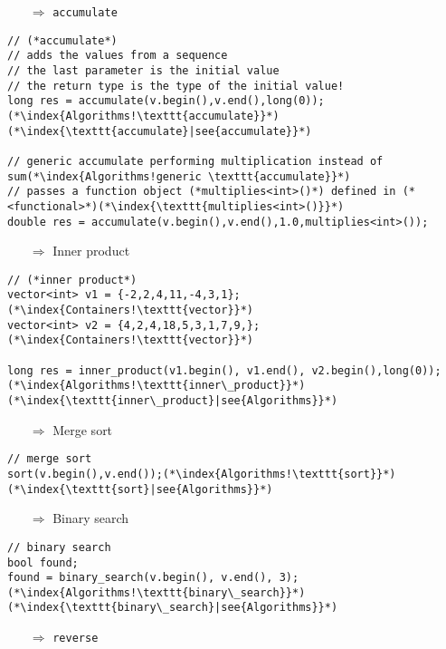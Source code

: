 \documentclass[10pt]{article}
\begin{document}
\begin{enumerate}
\item[$\Rightarrow$] \texttt{accumulate}
\end{enumerate}
\begin{lstlisting}
// (*accumulate*)
// adds the values from a sequence
// the last parameter is the initial value
// the return type is the type of the initial value!
long res = accumulate(v.begin(),v.end(),long(0));(*\index{Algorithms!\texttt{accumulate}}*)(*\index{\texttt{accumulate}|see{accumulate}}*)

// generic accumulate performing multiplication instead of sum(*\index{Algorithms!generic \texttt{accumulate}}*)
// passes a function object (*multiplies<int>()*) defined in (*<functional>*)(*\index{\texttt{multiplies<int>()}}*)
double res = accumulate(v.begin(),v.end(),1.0,multiplies<int>());
\end{lstlisting}
\begin{enumerate}
\item[$\Rightarrow$]  Inner product
\end{enumerate}
\begin{lstlisting}
// (*inner product*)
vector<int> v1 = {-2,2,4,11,-4,3,1};(*\index{Containers!\texttt{vector}}*)
vector<int> v2 = {4,2,4,18,5,3,1,7,9,};(*\index{Containers!\texttt{vector}}*)

long res = inner_product(v1.begin(), v1.end(), v2.begin(),long(0));(*\index{Algorithms!\texttt{inner\_product}}*)(*\index{\texttt{inner\_product}|see{Algorithms}}*)
\end{lstlisting}
\begin{enumerate}
\item[$\Rightarrow$] Merge sort
\end{enumerate}
\begin{lstlisting}
// merge sort
sort(v.begin(),v.end());(*\index{Algorithms!\texttt{sort}}*)(*\index{\texttt{sort}|see{Algorithms}}*)
\end{lstlisting}
\begin{enumerate}
\item[$\Rightarrow$] Binary search
\end{enumerate}
\begin{lstlisting}
// binary search
bool found;
found = binary_search(v.begin(), v.end(), 3);(*\index{Algorithms!\texttt{binary\_search}}*)(*\index{\texttt{binary\_search}|see{Algorithms}}*)
\end{lstlisting}
\begin{enumerate}
\item[$\Rightarrow$] \texttt{reverse}
\end{enumerate}
\end{document}
